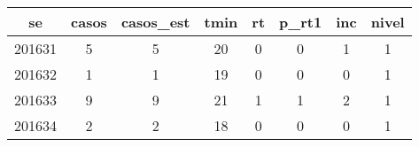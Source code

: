 \begin{tabular}{c|ccccccc}
  \hline
se & casos & casos\_est & tmin & rt & p\_rt1 & inc & nivel \\ 
  \hline
201631 & 5 & 5 & 20 & 0 & 0 & 1 & 1 \\ 
  201632 & 1 & 1 & 19 & 0 & 0 & 0 & 1 \\ 
  201633 & 9 & 9 & 21 & 1 & 1 & 2 & 1 \\ 
  201634 & 2 & 2 & 18 & 0 & 0 & 0 & 1 \\ 
   \hline
\end{tabular}
